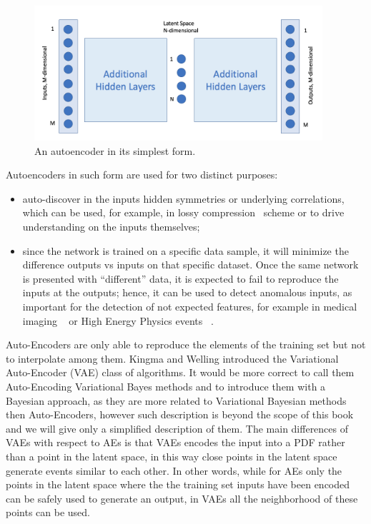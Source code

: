 \begin{figure}[htb]
     \centering
     \includegraphics[width=0.95\textwidth]{images/autoencoder.png}
     \caption{An autoencoder in its simplest form.}
     \label{fig:autoencoder}
 \end{figure}
 
 Autoencoders in such form are used for two distinct purposes:
 \begin{itemize}
     \item auto-discover in the inputs hidden symmetries or underlying correlations, which can be used, for example, in lossy compression~\cite{compression} scheme or to drive understanding on the inputs themselves; %
     \item since the network is trained on a specific data sample, it will minimize the difference outputs vs inputs on that specific dataset. Once the same network is presented with ``different'' data, it is expected to fail to reproduce the inputs at the outputs; hence, it can be used to detect anomalous inputs, as important for the detection of not expected features, for example in medical imaging ~\cite{anomalymed} or High Energy Physics events ~\cite{anomalyhep}. 
 \end{itemize}
 
Auto-Encoders are only able to reproduce the elements of the training set but not to interpolate among them. Kingma and Welling \cite{vae} introduced the Variational Auto-Encoder (VAE) class of algorithms. It would be more correct to call them Auto-Encoding Variational Bayes methods 
and to introduce them with a Bayesian approach, as they are more related to Variational Bayesian methods then Auto-Encoders, however such description is beyond the scope of this book and we will give only a simplified description of them. 
The main differences of VAEs with respect to AEs is that VAEs encodes the input into a PDF rather than a point in the latent space, in this way close points in the latent space generate events similar to each other.
In other words, while for AEs only the points in the latent space where the the training set inputs have been encoded can be safely used to generate an output, in VAEs all the neighborhood of these points can be used.

